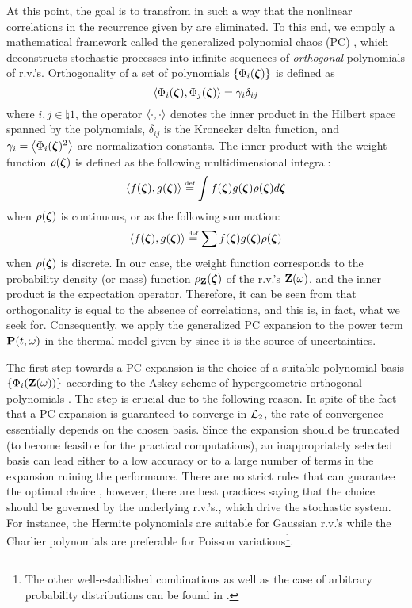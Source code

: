 At this point, the goal is to transfrom  in such a way that the nonlinear correlations in the recurrence given by  are eliminated. To this end, we empoly a mathematical framework called the generalized polynomial chaos (PC) \cite{xiu2002}, which deconstructs stochastic processes into infinite sequences of \emph{orthogonal} polynomials of r.v.'s. Orthogonality of a set of polynomials $\{ \Phi_i(\boldsymbol{\zeta}) \}$ is defined as
\begin{equation} \elabel{orthogonality}
  \oInner{\pcb_i(\vz)}{\pcb_j(\vz)} = \pcn_i \delta_{ij}
\end{equation}
where $i,j \in \natural{1}$, the operator $\oInner{\cd}{\cd}$ denotes the inner product in the Hilbert space spanned by the polynomials, $\delta_{ij}$ is the Kronecker delta function, and $\pcn_i = \oInner{\pcb_i(\vz)^2}$ are normalization constants. The inner product with the weight function $\rho(\boldsymbol{\zeta})$ is defined as the following multidimensional integral:
\begin{equation} \elabel{inner-product-integral}
  \oInner{f(\vz)}{g(\vz)} \eqdef \int f(\vz) g(\vz) \pdf(\vz) d\vz
\end{equation}
when $\rho(\boldsymbol{\zeta})$ is continuous, or as the following summation:
\begin{equation} \elabel{inner-product-sum}
  \oInner{f(\vz)}{g(\vz)} \eqdef \sum f(\vz) g(\vz) \pdf(\vz)
\end{equation}
when $\rho(\boldsymbol{\zeta})$ is discrete. In our case, the weight function corresponds to the probability density (or mass) function $\rho_{\mathbf{Z}}(\boldsymbol{\zeta})$ of the r.v.'s $\mathbf{Z}(\omega)$, and the inner product is the expectation operator. Therefore, it can be seen from  that orthogonality is equal to the absence of correlations, and this is, in fact, what we seek for. Consequently, we apply the generalized PC expansion to the power term $\mathbf{P}(t, \omega)$ in the thermal model given by  since it is the source of uncertainties.

The first step towards a PC expansion is the choice of a suitable polynomial basis $\{ \Phi_i(\mathbf{Z}(\omega)) \}$ according to the Askey scheme of hypergeometric orthogonal polynomials \cite{xiu2002}. The step is crucial due to the following reason. In spite of the fact that a PC expansion is guaranteed to converge in $\mathcal{L}_{2}$, the rate of convergence essentially depends on the chosen basis. Since the expansion should be truncated (to become feasible for the practical computations), an inappropriately selected basis can lead either to a low accuracy or to a large number of terms in the expansion ruining the performance. There are no strict rules that can guarantee the optimal choice \cite{knio2006}, however, there are best practices saying that the choice should be governed by the underlying r.v.'s., which drive the stochastic system. For instance, the Hermite polynomials are suitable for Gaussian r.v.'s while the Charlier polynomials are preferable for Poisson variations\footnote{The other well-established combinations as well as the case of arbitrary probability distributions can be found in \cite{xiu2002}.}.

